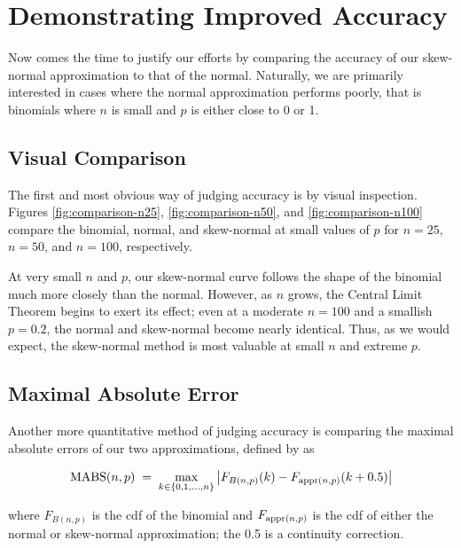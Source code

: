 \documentclass{article}
\begin{document}
\section{Demonstrating Improved Accuracy}
\label{sec:accuracy}

Now comes the time to justify our efforts by comparing the accuracy of our
skew-normal approximation to that of the normal. Naturally, we are primarily
interested in cases where the normal approximation performs poorly, that is
binomials where $n$ is small and $p$ is either close to 0 or 1.\footnotemark


\subsection{Visual Comparison}

The first and most obvious way of judging accuracy is by visual inspection.
Figures \ref{fig:comparison-n25}, \ref{fig:comparison-n50}, and
\ref{fig:comparison-n100} compare the binomial, normal, and skew-normal at
small values of $p$ for $n=25$, $n=50$, and $n=100$, respectively.

At very small $n$ and $p$, our skew-normal curve follows the shape of the
binomial much more closely than the normal. However, as $n$ grows, the Central
Limit Theorem begins to exert its effect; even at a moderate $n = 100$ and a
smallish $p = 0.2$, the normal and skew-normal become nearly identical. Thus,
as we would expect, the skew-normal method is most valuable at small $n$ and
extreme $p$.

\subsection{Maximal Absolute Error}
\label{subsec:mabs}

Another more quantitative method of judging accuracy is comparing the maximal
absolute errors of our two approximations, defined by \citet{mabs} as

\begin{equation}
  \textnormal{MABS}(n, p) \;=\; \max_{k \in \{0, 1,...,n\}} \left| F_{B(n,p)} (k) -  F_{\textnormal{appr}(n,p)}(k + 0.5) \right|
\end{equation}

where $F_{B(n,p)}$ is the cdf of the binomial and $F_{\textnormal{appr}(n,p)}$
is the cdf of either the normal or skew-normal approximation; the 0.5 is a
continuity correction.
\end{document}
